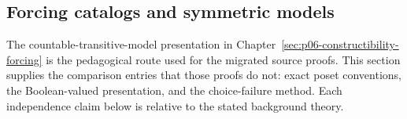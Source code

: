 
\begingroup
\pagestyle{plain}%
\begin{landscape}
\thispagestyle{plain}%
\section{Forcing catalogs and symmetric models}
\label{sec:p06-forcing-variants}

The countable-transitive-model presentation in
Chapter~\ref{sec:p06-constructibility-forcing} is the pedagogical route used
for the migrated source proofs.  This section supplies the comparison entries
that those proofs do not: exact poset conventions, the Boolean-valued
presentation, and the choice-failure method.  Each independence claim below is
relative to the stated background theory.


\end{landscape}
